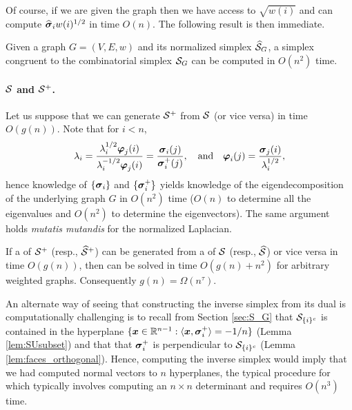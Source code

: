 Of course, if we are given the graph then we have access to $\sqrt{w(i)}$ and can compute $\widehat{\vb*{\sigma}}_i w(i)^{1/2}$ in time $O(n)$. The following result is then immediate. 

\begin{lemma}
	Given a graph $G=(V,E,w)$ and its normalized simplex $\widehat{\mathcal{S}}_G$, a simplex congruent to  the combinatorial simplex $\mathcal{S}_G$ can be computed in $O(n^2)$ time. 
\end{lemma}




\paragraph{\texorpdfstring{$\mathcal{S}$}{The combinatorial} and \texorpdfstring{$\mathcal{S}^+$}{normalized simplex}.}

Let us suppose that we can generate $\mathcal{S}^+$ from $\mathcal{S}$ (or vice versa) in time $O(g(n))$. Note that for $i<n$, 
\[\lambda_i = \frac{\lambda_i^{1/2} \vb*{\varphi}_j(i)}{\lambda_i^{-1/2}\vb*{\varphi}_j(i)} = \frac{\vb*{\sigma}_i(j)}{\vb*{\sigma}_i^+(j)}, \quad \text{and} \quad \vb*{\varphi}_i(j) = \frac{\vb*{\sigma}_j(i)}{\lambda_i^{1/2}},\]
hence knowledge of $\{\vb*{\sigma}_i\}$ and $\{\vb*{\sigma}_i^+\}$ yields knowledge of the eigendecomposition of the underlying graph $G$ in $O(n^2)$ time ($O(n)$ to determine all the  eigenvalues and $O(n^2)$ to determine the eigenvectors). The same argument holds \emph{mutatis mutandis} for the normalized Laplacian. 

\begin{lemma}
	\label{lem:S_to_S^+_vdesc}
	If a \vdesc of $\mathcal{S}^+$  (resp., $\widehat{\mathcal{S}}^+$) can be generated from a \vdesc of $\mathcal{S}$ (resp., $\widehat{\mathcal{S}}$) or vice versa in time $O(g(n))$, then \lapdecomp can be solved in time $O(g(n) + n^2)$ for arbitrary weighted graphs. Consequently $g(n) = \Omega(n^\tau)$.  
\end{lemma}

An alternate way of seeing that constructing the inverse simplex from its dual is computationally challenging is to recall from Section \ref{sec:S_G} that $\mathcal{S}_{\{i\}^c}$ is contained in the hyperplane $\{\vb*{x}\in\mathbb{R}^{n-1}:\langle \vb*{x},\vb*{\sigma}_i^+\rangle = -1/n\}$ (Lemma \ref{lem:SUsubset})
 and that that $\vb*{\sigma}_i^+$ is perpendicular to $\mathcal{S}_{\{i\}^c}$ (Lemma \ref{lem:faces_orthogonal}). Hence, computing the inverse simplex would imply that we had computed normal vectors to $n$ hyperplanes, the typical procedure for which typically involves computing an $n\times n$ determinant and requires  $O(n^3)$ time. 
 
